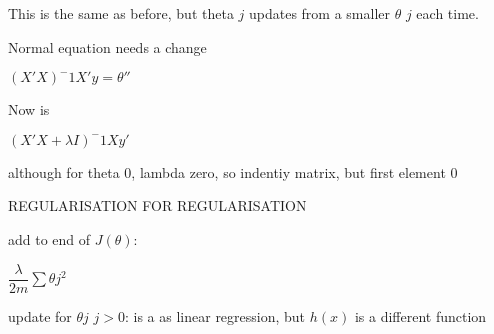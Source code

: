 This is the same as before, but theta \(j\) updates from a smaller \(\theta \) \(j\) each time.

Normal equation needs a change

\((X'X)^-1X'y=\theta''\)

Now is

\((X'X+\lambda I)^-1X y'\)

although for theta 0, lambda zero, so indentiy matrix, but first element 0

REGULARISATION FOR REGULARISATION

add to end of \(J(\theta)\):

\(\dfrac{\lambda }{2m} \sum \theta j^2\)

update for \(\theta \)\(j\) \(j>0\):
is a as linear regression, but \(h(x)\) is a different function


